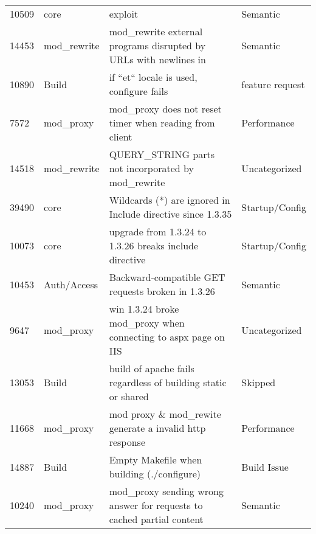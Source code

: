 \begin{longtable}[c]{p{1cm}p{3cm}p{6cm}p{4cm}}
10509  & core               & exploit                                                                                                        & Semantic          \\
14453  & mod\_rewrite       & mod\_rewrite external programs disrupted by URLs with newlines in                                              & Semantic          \\
10890  & Build              & if ``et`` locale is used, configure fails                                                                        & feature request   \\
7572   & mod\_proxy         & mod\_proxy does not reset timer when reading from client                                                       & Performance       \\
14518  & mod\_rewrite       & QUERY\_STRING parts not incorporated by mod\_rewrite                                                           & Uncategorized     \\
39490  & core               & Wildcards (*) are ignored in Include directive since 1.3.35                                                    & Startup/Config    \\
10073  & core               & upgrade from 1.3.24 to 1.3.26 breaks include directive                                                         & Startup/Config    \\
10453  & Auth/Access        & Backward-compatible GET requests broken in 1.3.26                                                              & Semantic          \\
9647   & mod\_proxy         & win 1.3.24 broke mod\_proxy when connecting to aspx page on IIS                                                & Uncategorized     \\
13053  & Build              & build of apache fails regardless of building static or shared                                                  & Skipped           \\
11668  & mod\_proxy         & mod proxy \& mod\_rewite generate a invalid http response                                                      & Performance       \\
14887  & Build              & Empty Makefile when building (./configure)                                                                     & Build Issue       \\
10240  & mod\_proxy         & mod\_proxy sending wrong answer for requests to cached partial content                                         & Semantic          \\

\end{longtable}
